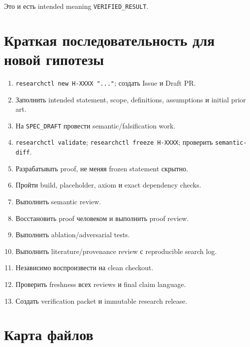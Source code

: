 \documentclass[11pt,a4paper]{article}
\newcommand{\status}[1]{\texttt{#1}}
\newcommand{\cmd}[1]{\texttt{#1}}
\begin{document}
Это и есть intended meaning \status{VERIFIED\_RESULT}.

\appendix
\section{Краткая последовательность для новой гипотезы}

\begin{enumerate}
\item \cmd{researchctl new H-XXXX "..."}; создать Issue и Draft PR.
\item Заполнить intended statement, scope, definitions, assumptions и initial prior art.
\item На \status{SPEC\_DRAFT} провести semantic/falsification work.
\item \cmd{researchctl validate}; \cmd{researchctl freeze H-XXXX}; проверить \cmd{semantic-diff}.
\item Разрабатывать proof, не меняя frozen statement скрытно.
\item Пройти build, placeholder, axiom и exact dependency checks.
\item Выполнить semantic review.
\item Восстановить proof человеком и выполнить proof review.
\item Выполнить ablation/adversarial tests.
\item Выполнить literature/provenance review с reproducible search log.
\item Независимо воспроизвести на clean checkout.
\item Проверить freshness всех reviews и final claim language.
\item Создать verification packet и immutable research release.
\end{enumerate}

\section{Карта файлов}
\end{document}
